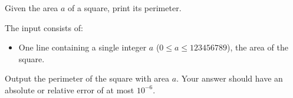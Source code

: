 \problemname{\problemyamlname}


\newcommand{\maxa}{123456789}

Given the area $a$ of a square, print its perimeter.

\begin{Input}
	The input consists of:
	\begin{itemize}
		\item One line containing a single integer $a$ ($0\leq a\leq \maxa$), the area of the square.
	\end{itemize}
\end{Input}

\begin{Output}
	Output the perimeter of the square with area $a$.
	Your answer should have an absolute or relative error of at most $10^{-6}$.
\end{Output}
